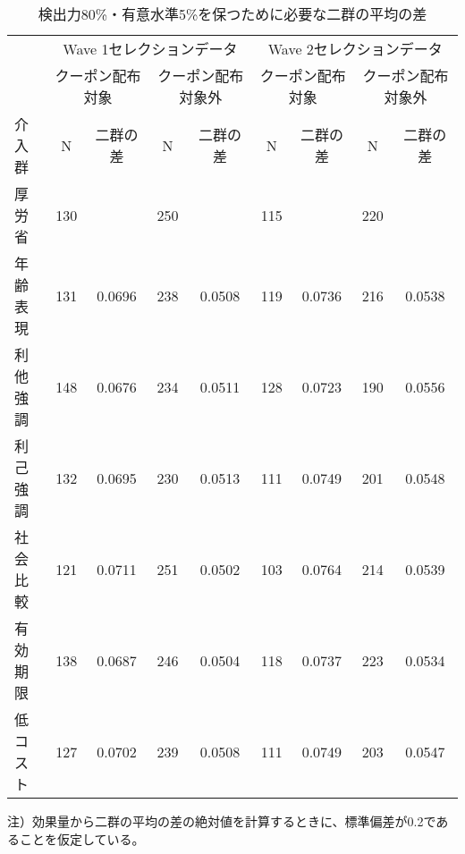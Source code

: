 \documentclass[
  11pt,
  a4paper,
]{article}
\begin{document}
\begin{table}

\caption{\label{tab:AprioriPowerAnalysis}検出力80\%・有意水準5\%を保つために必要な二群の平均の差}
\centering
\fontsize{9}{11}\selectfont
\begin{threeparttable}
\begin{tabular}[t]{lcccccccc}
\toprule
\multicolumn{1}{c}{ } & \multicolumn{4}{c}{Wave 1セレクションデータ} & \multicolumn{4}{c}{Wave 2セレクションデータ} \\
\cmidrule(l{3pt}r{3pt}){2-5} \cmidrule(l{3pt}r{3pt}){6-9}
\multicolumn{1}{c}{ } & \multicolumn{2}{c}{クーポン配布対象} & \multicolumn{2}{c}{クーポン配布対象外} & \multicolumn{2}{c}{クーポン配布対象} & \multicolumn{2}{c}{クーポン配布対象外} \\
\cmidrule(l{3pt}r{3pt}){2-3} \cmidrule(l{3pt}r{3pt}){4-5} \cmidrule(l{3pt}r{3pt}){6-7} \cmidrule(l{3pt}r{3pt}){8-9}
介入群 & N & 二群の差 & N  & 二群の差  & N   & 二群の差   & N    & 二群の差   \\
\midrule
厚労省 & 130 &  & 250 &  & 115 &  & 220 & \\
年齢表現 & 131 & 0.0696 & 238 & 0.0508 & 119 & 0.0736 & 216 & 0.0538\\
利他強調 & 148 & 0.0676 & 234 & 0.0511 & 128 & 0.0723 & 190 & 0.0556\\
利己強調 & 132 & 0.0695 & 230 & 0.0513 & 111 & 0.0749 & 201 & 0.0548\\
社会比較 & 121 & 0.0711 & 251 & 0.0502 & 103 & 0.0764 & 214 & 0.0539\\
有効期限 & 138 & 0.0687 & 246 & 0.0504 & 118 & 0.0737 & 223 & 0.0534\\
低コスト & 127 & 0.0702 & 239 & 0.0508 & 111 & 0.0749 & 203 & 0.0547\\
\bottomrule
\end{tabular}
\begin{tablenotes}
\item 注）効果量から二群の平均の差の絶対値を計算するときに、標準偏差が0.2であることを仮定している。
\end{tablenotes}
\end{threeparttable}
\end{table}
\end{document}
